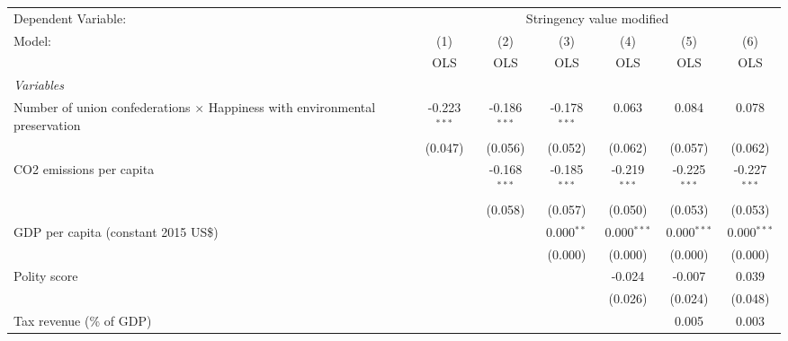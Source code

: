 
\begingroup
\centering
\begin{tabular}{lcccccc}
   \toprule
   Dependent Variable: & \multicolumn{6}{c}{Stringency value modified}\\
   Model:                                                                             & (1)            & (2)            & (3)            & (4)            & (5)            & (6)\\  
                                                                                      &  OLS           & OLS            & OLS            & OLS            & OLS            & OLS\\  
   \midrule
   \emph{Variables}\\
   Number of union confederations $\times$ Happiness with environmental preservation  & -0.223$^{***}$ & -0.186$^{***}$ & -0.178$^{***}$ & 0.063          & 0.084          & 0.078\\   
                                                                                      & (0.047)        & (0.056)        & (0.052)        & (0.062)        & (0.057)        & (0.062)\\   
   CO2 emissions per capita                                                           &                & -0.168$^{***}$ & -0.185$^{***}$ & -0.219$^{***}$ & -0.225$^{***}$ & -0.227$^{***}$\\   
                                                                                      &                & (0.058)        & (0.057)        & (0.050)        & (0.053)        & (0.053)\\   
   GDP per capita (constant 2015 US\$)                                                &                &                & 0.000$^{**}$   & 0.000$^{***}$  & 0.000$^{***}$  & 0.000$^{***}$\\   
                                                                                      &                &                & (0.000)        & (0.000)        & (0.000)        & (0.000)\\   
   Polity score                                                                       &                &                &                & -0.024         & -0.007         & 0.039\\   
                                                                                      &                &                &                & (0.026)        & (0.024)        & (0.048)\\   
   Tax revenue (\% of GDP)                                                            &                &                &                &                & 0.005          & 0.003\\   

\end{tabular}
